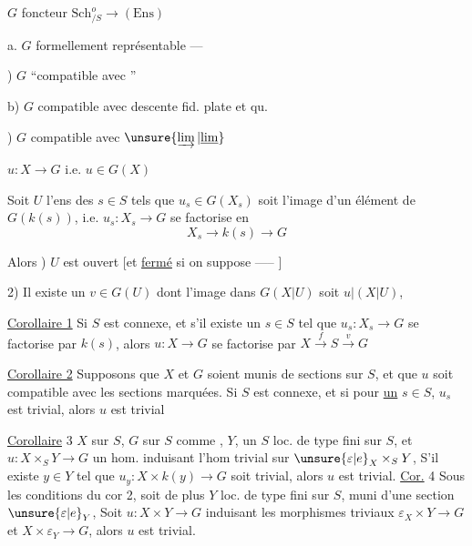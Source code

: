 $G$ foncteur $\mathrm{Sch}_{/S}^{o}\longrightarrow(\mathrm{Ens})$


a. $G$ formellement représentable ---


) $G$ ``compatible avec  ''

b) $G$  compatible avec descente fid. plate et qu. 

) $G$ compatible avec $\unsure{\varinjlim|\underline{\lim}}$  


$u:X\to G$ i.e. $u\in G(X)$

Soit $U$ l'ens des $s\in S$ tels que $u_s\in G(X_s)$ soit l'image d'un élément de $G(k(s))$, i.e. $u_s:X_s\to G$ se factorise en
\[
X_s\longrightarrow k(s)\longrightarrow G
\]

Alors ) $U$ est ouvert [et \uline{fermé} si on suppose ----- ]

2) Il existe un  $v\in G(U)$  dont l'image dans $G(X|U)$ soit $u|(X|U)$, 

\uline{Corollaire 1} Si $S$ est connexe, et s'il existe un $s\in S$ tel que $u_s:X_s\to G$ se factorise par $k(s)$, alors $u:X\to G$ se factorise par $X\xrightarrow{f}S\xrightarrow{v}G$

\uline{Corollaire 2} Supposons que $X$ et $G$ soient munis de sections sur $S$, et que $u$ soit compatible avec les sections marquées. Si $S$ est connexe, et si pour \uline{un} $s\in S$, $u_s$ est trivial, alors $u$ est trivial

\uline{Corollaire} 3 \quad $X$ sur $S$,  $G$ sur $S$ comme   , $Y$, un $S$ loc. de type fini sur $S$,  et $u:X\times_S Y\to G$ un hom. induisant  l'hom trivial sur $\unsure{\varepsilon|e}_X\times_S Y$,  S'il existe $y\in Y$ tel que $u_y:X\times k(y)\to G$ soit trivial, alors $u$ est trivial.
\uline{Cor.} 4 \quad Sous les conditions du cor 2, soit de plus $Y$ loc. de type fini sur $S$,  muni d'une section $\unsure{\varepsilon|e}_Y$, Soit $u:X\times Y\to G$ induisant les morphismes triviaux $\varepsilon_X\times Y\to G$ et $X\times\varepsilon_Y\to G$, alors $u$ est trivial.

